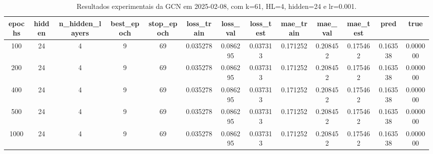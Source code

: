\begin{table}[h]
\centering
\caption{Resultados experimentais da GCN em 2025-02-08, com k=61, HL=4, hidden=24 e lr=0.001.}
\label{tab:gcn_results_k61_hl4_h24_d20250208}
\begin{tabular}{ccccccccccccc}
\toprule
epochs & hidden & n\_hidden\_layers & best\_epoch & stop\_epoch & loss\_train & loss\_val & loss\_test & mae\_train & mae\_val & mae\_test & pred & true \\
\midrule
100 & 24 & 4 & 9 & 69 & 0.035278 & 0.086295 & 0.037313 & 0.171252 & 0.208452 & 0.175462 & 0.163538 & 0.000000 \\
200 & 24 & 4 & 9 & 69 & 0.035278 & 0.086295 & 0.037313 & 0.171252 & 0.208452 & 0.175462 & 0.163538 & 0.000000 \\
400 & 24 & 4 & 9 & 69 & 0.035278 & 0.086295 & 0.037313 & 0.171252 & 0.208452 & 0.175462 & 0.163538 & 0.000000 \\
500 & 24 & 4 & 9 & 69 & 0.035278 & 0.086295 & 0.037313 & 0.171252 & 0.208452 & 0.175462 & 0.163538 & 0.000000 \\
1000 & 24 & 4 & 9 & 69 & 0.035278 & 0.086295 & 0.037313 & 0.171252 & 0.208452 & 0.175462 & 0.163538 & 0.000000 \\
\bottomrule
\end{tabular}
\end{table}
